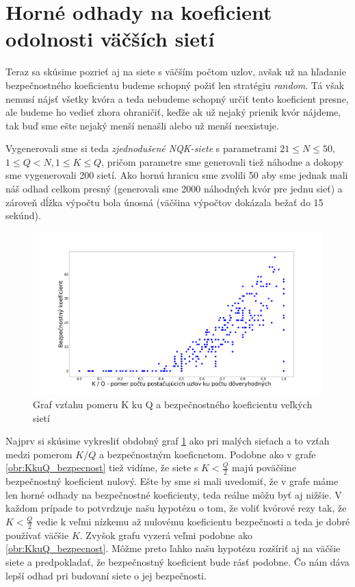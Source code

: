 \section {Horné odhady na koeficient odolnosti väčších sietí}

Teraz sa skúsime pozrieť aj na siete s väčším počtom uzlov, avšak už
na hľadanie bezpečnostného koeficientu budeme schopný požiť len stratégiu
\textit{random}. Tá však nemusí nájsť všetky kvóra a teda nebudeme schopný
určiť tento koeficient presne, ale budeme ho vedieť zhora ohraničiť,
keďže ak už nejaký prienik kvór nájdeme, tak buď sme ešte nejaký menší nenašli
alebo už menší neexistuje.

Vygenerovali sme si teda \textit{zjednodušené NQK-siete} s parametrami
$21\leq N\leq 50,$\\
$1\leq Q < N, 1\leq K\leq Q$, pričom parametre sme generovali tiež náhodne
a dokopy sme vygenerovali 200 sietí.
Ako hornú hranicu sme zvolili 50 aby sme jednak mali náš odhad celkom presný
(generovali sme 2000 náhodných kvór pre jednu sieť) a zároveň
dĺžka výpočtu bola únosná (väčšina výpočtov dokázala bežať do 15 sekúnd).

\begin{figure}
\centerline{\includegraphics[width=1.2\textwidth]{images/KkuQ_prienik_large.png}}
\caption{Graf vzťahu pomeru K ku Q a bezpečnostného koeficientu veľkých sietí} \label{obr:KkuQ_bezpecnost_large}
\end{figure}

Najprv si skúsime vykresliť obdobný graf \ref{obr:KkuQ_bezpecnost_large} ako
pri malých sieťach a to vzťah medzi pomerom $K/Q$ a bezpečnostným koeficnetom.
Podobne ako v grafe \ref{obr:KkuQ_bezpecnost} tiež vidíme, že siete s
$K<\frac{Q}{2}$ majú poväčšine bezpečnostný koeficient nulový. Ešte by sme si
mali uvedomiť, že v grafe máme len horné odhady na bezpečnostné koeficienty,
teda reálne môžu byť aj nižšie. V každom prípade to potvrdzuje našu hypotézu
o tom, že voliť kvórové rezy tak, že $K<\frac{Q}{2}$ vedie k veľmi nízkemu
až nulovému koeficientu bezpečnosti a teda je dobré používať väčšie $K$.
Zvyšok grafu vyzerá veľmi podobne ako \ref{obr:KkuQ_bezpecnost}.
Môžme preto ľahko našu hypotézu rozšíriť aj na väčšie siete a predpokladať,
že bezpečnostný koeficient bude rásť podobne.
Čo nám dáva lepší odhad pri budovaní siete o jej bezpečnosti.

